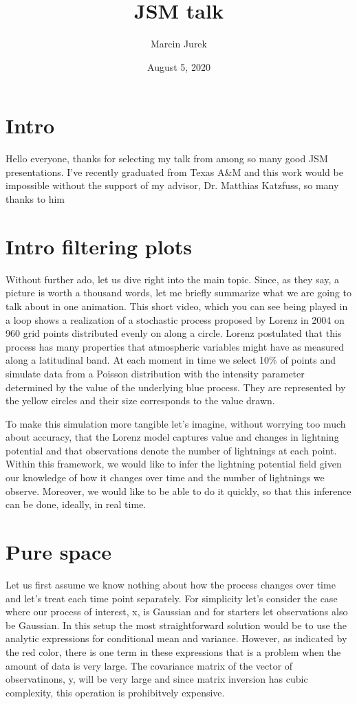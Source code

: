 \documentclass[14pt]{extarticle} %
\title{JSM talk}
\author{Marcin Jurek}
\date{August 5, 2020} %
\begin{document}
\maketitle

\section*{Intro}
Hello everyone, thanks for selecting my talk from among so many good JSM presentations. I've recently graduated from Texas A\&M and this work would be impossible without the support of my advisor, Dr. Matthias Katzfuss, so many thanks to him


\newpage
\section*{Intro filtering plots}

Without further ado, let us dive right into the main topic. Since, as they say, a picture is worth a thousand words, let me briefly summarize what we are going to talk about in one animation. This short video, which you can see being played in a loop shows a realization of a stochastic process proposed by Lorenz in 2004 on 960 grid points distributed evenly on along a circle. Lorenz postulated that this process has many properties that atmospheric variables might have as measured along a latitudinal band. At each moment in time we select 10\% of points and simulate data from a Poisson distribution with the intensity parameter determined by the value of the underlying blue process. They are represented by the yellow circles and their size corresponds to the value drawn. 

To make this simulation more tangible let's imagine, without worrying too much about accuracy, that the Lorenz model captures value and changes in lightning potential and that observations denote the number of lightnings at each point. Within this framework, we would like to infer the lightning potential field given our knowledge of how it changes over time and the number of lightnings we observe. Moreover, we would like to be able to do it quickly, so that this inference can be done, ideally, in real time. 

\newpage
\section*{Pure space}


Let us first assume we know nothing about how the process changes over time and let's treat each time point separately. For simplicity let's consider the case where our process of interest, x, is Gaussian and for starters let observations also be Gaussian. In this setup the most straightforward solution would be to use the analytic expressions for conditional mean and variance. However, as indicated by the red color, there is one term in these expressions that is a problem when the amount of data is very large. The covariance matrix of the vector of observatinons, y, will be very large and since matrix inversion has cubic complexity, this operation is prohibitvely expensive. 
\end{document}
